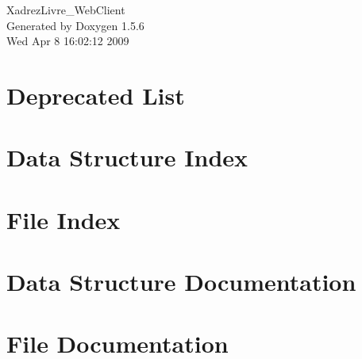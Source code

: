 \documentclass[a4paper]{book}
\begin{document}
\begin{titlepage}
\vspace*{7cm}
\begin{center}
{\Large XadrezLivre\_\-WebClient }\\
\vspace*{1cm}
{\large Generated by Doxygen 1.5.6}\\
\vspace*{0.5cm}
{\small Wed Apr 8 16:02:12 2009}\\
\end{center}
\end{titlepage}
\clearemptydoublepage
{}
\tableofcontents
\clearemptydoublepage
{}
\chapter{Deprecated List}
\label{deprecated}

\chapter{Data Structure Index}

\chapter{File Index}

\chapter{Data Structure Documentation}



\chapter{File Documentation}




























































\printindex
\end{document}
